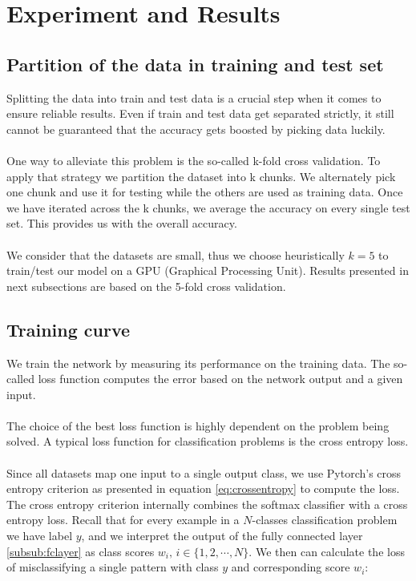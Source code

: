 \documentclass[a4paper, 11pt, twoside, openright]{article}
\begin{document}
\section{Experiment and Results} \label{resultsref}

\subsection{Partition of the data in training and test set}
 \label{partitioning_train_test}
Splitting the data into train and test data is a crucial step when it comes to ensure reliable results. Even if train and test data get separated strictly, it still cannot be guaranteed that the accuracy gets boosted by picking data luckily.
\\ \\
One way to alleviate this problem is the so-called k-fold cross validation. To apply that strategy we partition the dataset into k chunks. We alternately pick one chunk and use it for testing while the others are used as training data. Once we have iterated across the k chunks, we average the accuracy on every single test set. This provides us with the overall accuracy.
\\ \\
We consider that the datasets are small, thus we choose heuristically $k=5$ to train/test our model on a GPU (Graphical Processing Unit). Results presented in next subsections are based on the 5-fold cross validation.
\subsection{Training curve}

We train the network by measuring its performance on the training data. The so-called loss function computes the error based on the network output and a given input.
\\ \\
The choice of the best loss function is highly dependent on the problem being solved. A typical loss function for classification problems is the cross entropy loss.
\\ \\
Since all datasets map one input to a single output class, we use Pytorch's cross entropy criterion as presented in equation \ref{eq:crossentropy} to compute the loss. The cross entropy criterion internally combines the softmax classifier with a cross entropy loss. Recall that for every example in a $N$-classes classification problem we have label $y$, and we interpret the output of the fully connected layer \ref{subsub:fclayer} as class scores $w_i, \, i \in \{1, 2, \cdots , N\}$. We then can calculate the loss of misclassifying a single pattern with class $y$ and corresponding score $w_i$:
\end{document}
